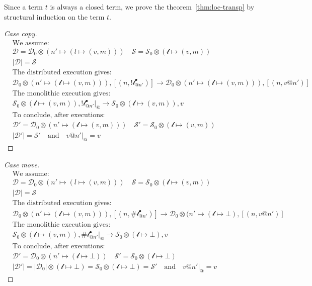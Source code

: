 Since a term $t$ is always a closed term, we prove the theorem~\ref{thm:loc-transp} by structural induction on the term $t$.
\begin{proof}[Case copy]
    \begin{align*}
    &\text{We assume:}\\
    &\mathcal{D} = \mathcal{D}_0 \otimes (n' \mapsto (l\mapsto (v, m)))\quad
    \mathcal{S} = \mathcal{S}_0 \otimes (\mathscr{l} \mapsto (v, m))\\
    &|\mathcal{D}| = \mathcal{S}\\
    &\text{The distributed execution gives:}\\
    &\mathcal{D}_0 \otimes (n' \mapsto (\mathscr{l} \mapsto (v,m))) , [(n, !\mathscr{l}^\bullet_{@n'})] \longrightarrow \mathcal{D}_0 \otimes (n' \mapsto (\mathscr{l} \mapsto (v, m))), [(n, v@n')]\\
    &\text{The monolithic execution gives:}\\
    &\mathcal{S}_0 \otimes (\mathscr{l} \mapsto (v, m)), !\mathscr{l}^\bullet_{@n'}|_@ \longrightarrow \mathcal{S}_0 \otimes (\mathscr{l} \mapsto (v, m)), v\\
    &\text{To conclude, after executions:}\\
    &\mathcal{D}' = \mathcal{D}_0 \otimes (n' \mapsto (\mathscr{l} \mapsto (v, m))) \quad 
    \mathcal{S}' = \mathcal{S}_0 \otimes (\mathscr{l} \mapsto (v, m))\\
    &|\mathcal{D}'| = \mathcal{S}' \quad \text{and} \quad v@n'|_@ = v
    \end{align*}
\end{proof}
\begin{proof}[Case move]
    \begin{align*}
    &\text{We assume:}\\
    &\mathcal{D} = \mathcal{D}_0 \otimes (n' \mapsto (l\mapsto (v, m)))\quad
    \mathcal{S} = \mathcal{S}_0 \otimes (\mathscr{l} \mapsto (v, m))\\
    &|\mathcal{D}| = \mathcal{S}\\
    &\text{The distributed execution gives:}\\
    &\mathcal{D}_0 \otimes (n' \mapsto (\mathscr{l} \mapsto (v,m))) , [(n, \#\mathscr{l}^\bullet_{@n'})] \longrightarrow \mathcal{D}_0 \otimes (n' \mapsto (\mathscr{l} \mapsto \bot), [(n, v@n')]\\
    &\text{The monolithic execution gives:}\\
    &\mathcal{S}_0 \otimes (\mathscr{l} \mapsto (v, m)), \#\mathscr{l}^\bullet_{@n'}|_@ \longrightarrow \mathcal{S}_0 \otimes (\mathscr{l} \mapsto \bot), v\\
    &\text{To conclude, after executions:}\\
    &\mathcal{D}' = \mathcal{D}_0 \otimes (n' \mapsto (\mathscr{l} \mapsto \bot)) \quad 
    \mathcal{S}' = \mathcal{S}_0 \otimes (\mathscr{l} \mapsto \bot)\\
    &|\mathcal{D}'| = |\mathcal{D}_0| \otimes (\mathscr{l} \mapsto \bot) = \mathcal{S}_0 \otimes (\mathscr{l} \mapsto \bot) = \mathcal{S}' \quad \text{and} \quad v@n'|_@ = v
    \end{align*}
\end{proof}
